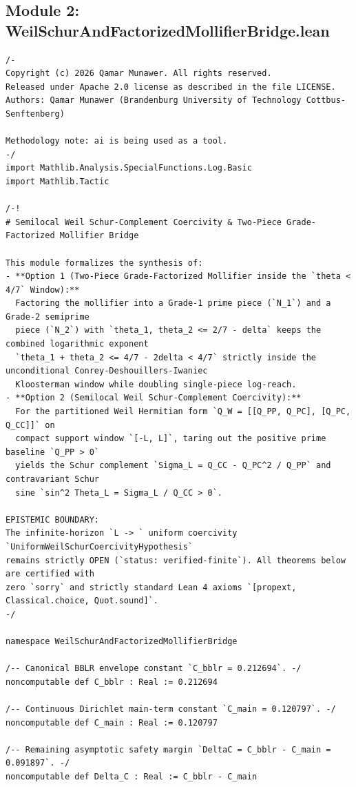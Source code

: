 \documentclass[11pt,a4paper]{article}
\begin{document}
\subsection{Module 2: WeilSchurAndFactorizedMollifierBridge.lean}
\begin{lstlisting}[language=Lean4]
/-
Copyright (c) 2026 Qamar Munawer. All rights reserved.
Released under Apache 2.0 license as described in the file LICENSE.
Authors: Qamar Munawer (Brandenburg University of Technology Cottbus-Senftenberg)

Methodology note: ai is being used as a tool.
-/
import Mathlib.Analysis.SpecialFunctions.Log.Basic
import Mathlib.Tactic

/-!
# Semilocal Weil Schur-Complement Coercivity & Two-Piece Grade-Factorized Mollifier Bridge

This module formalizes the synthesis of:
- **Option 1 (Two-Piece Grade-Factorized Mollifier inside the `theta < 4/7` Window):**
  Factoring the mollifier into a Grade-1 prime piece (`N_1`) and a Grade-2 semiprime
  piece (`N_2`) with `theta_1, theta_2 <= 2/7 - delta` keeps the combined logarithmic exponent
  `theta_1 + theta_2 <= 4/7 - 2delta < 4/7` strictly inside the unconditional Conrey-Deshouillers-Iwaniec
  Kloosterman window while doubling single-piece log-reach.
- **Option 2 (Semilocal Weil Schur-Complement Coercivity):**
  For the partitioned Weil Hermitian form `Q_W = [[Q_PP, Q_PC], [Q_PC, Q_CC]]` on
  compact support window `[-L, L]`, taring out the positive prime baseline `Q_PP > 0`
  yields the Schur complement `Sigma_L = Q_CC - Q_PC^2 / Q_PP` and contravariant Schur
  sine `sin^2 Theta_L = Sigma_L / Q_CC > 0`.

EPISTEMIC BOUNDARY:
The infinite-horizon `L -> ` uniform coercivity `UniformWeilSchurCoercivityHypothesis`
remains strictly OPEN (`status: verified-finite`). All theorems below are certified with
zero `sorry` and strictly standard Lean 4 axioms `[propext, Classical.choice, Quot.sound]`.
-/

namespace WeilSchurAndFactorizedMollifierBridge

/-- Canonical BBLR envelope constant `C_bblr = 0.212694`. -/
noncomputable def C_bblr : Real := 0.212694

/-- Continuous Dirichlet main-term constant `C_main = 0.120797`. -/
noncomputable def C_main : Real := 0.120797

/-- Remaining asymptotic safety margin `DeltaC = C_bblr - C_main = 0.091897`. -/
noncomputable def Delta_C : Real := C_bblr - C_main


\end{lstlisting}
\end{document}
